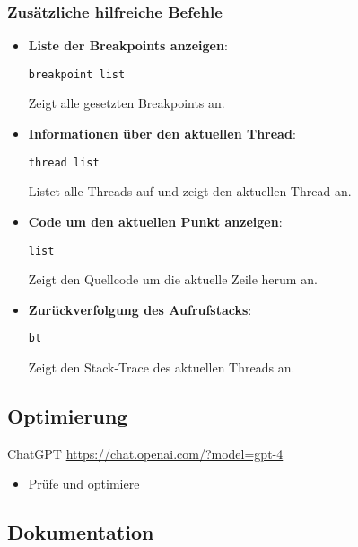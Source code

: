 \documentclass{vorlage-design-main}
\begin{document}
\hypertarget{zusuxe4tzliche-hilfreiche-befehle}{%
\subsubsection{Zusätzliche hilfreiche
Befehle}\label{zusaetzliche-hilfreiche-befehle}}

\begin{itemize}
\item
  \textbf{Liste der Breakpoints anzeigen}:

\begin{lstlisting}
breakpoint list
\end{lstlisting}

  Zeigt alle gesetzten Breakpoints an.
\item
  \textbf{Informationen über den aktuellen Thread}:

\begin{lstlisting}
thread list
\end{lstlisting}

  Listet alle Threads auf und zeigt den aktuellen Thread an.
\item
  \textbf{Code um den aktuellen Punkt anzeigen}:

\begin{lstlisting}
list
\end{lstlisting}

  Zeigt den Quellcode um die aktuelle Zeile herum an.
\item
  \textbf{Zurückverfolgung des Aufrufstacks}:

\begin{lstlisting}
bt
\end{lstlisting}

  Zeigt den Stack-Trace des aktuellen Threads an.
\end{itemize}

\hypertarget{optimierung}{%
\subsection{Optimierung}\label{optimierung}}

ChatGPT \url{https://chat.openai.com/?model=gpt-4}

\begin{itemize}

\item
  Prüfe und optimiere
\end{itemize}

\hypertarget{dokumentation}{%
\subsection{Dokumentation}\label{dokumentation}}
\end{document}
